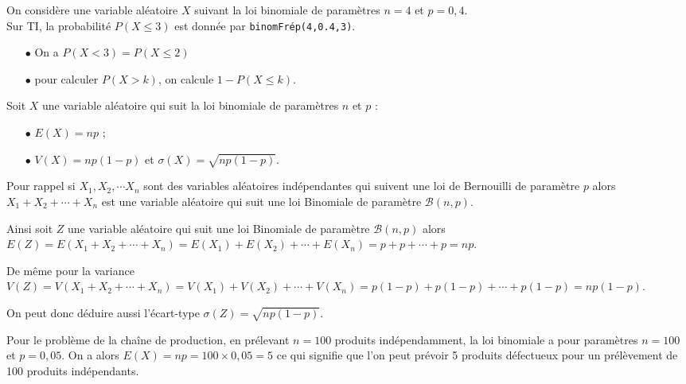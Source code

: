 \documentclass[french]{book}
\newcommand{\calb}{\mathscr{B}}
\begin{document}
\begin{exemple}
On considère une variable aléatoire $X$ suivant la loi binomiale de paramètres $n=4$ et $p=0,4$.\\
Sur TI, la probabilité $P(X\leq 3)$ est donnée par \texttt{binomFrép(4,0.4,3)}.
\end{exemple}

\begin{rem}
\begin{itemize}
\item[$\bullet$] On a $P(X<3)=P(X\leq 2)$\\
\item[$\bullet$] pour calculer $P(X>k)$, on calcule $1-P(X\leq k)$.
\end{itemize}
\end{rem}

\begin{prop}
Soit $X$ une variable aléatoire qui suit la loi binomiale de paramètres $n$ et $p$ :
\begin{itemize}
\item[$\bullet$] $E(X)=np$ ;
\item[$\bullet$] $V(X)=np(1-p)$ et $\sigma(X)=\sqrt{np(1-p)}$.
\end{itemize}
\end{prop}

\begin{demo}
Pour rappel si $X_1,X_2,\cdots X_n$ sont des variables aléatoires indépendantes qui suivent une loi de Bernouilli de paramètre $p$ alors $X_1+X_2+\cdots + X_n$ est une variable aléatoire qui suit une loi Binomiale de paramètre $\calb(n,p)$.

Ainsi soit $Z$ une variable aléatoire qui suit une loi Binomiale de paramètre $\calb(n,p)$ alors $E(Z)=E(X_1+X_2+\cdots + X_n)=E(X_1)+E(X_2)+\cdots +E(X_n)=p+p+\cdots+p=np$.

De même pour la variance $V(Z)=V(X_1+X_2+\cdots + X_n)=V(X_1)+V(X_2)+\cdots +V(X_n)=p(1-p)+p(1-p)+\cdots+p(1-p)=np(1-p)$.

On peut donc déduire aussi l'écart-type $\sigma(Z)=\sqrt{np(1-p)}$.
\end{demo}


\begin{exemple}
Pour le problème de la chaîne de production, en prélevant $n=100$ produits indépendamment, la loi binomiale a pour paramètres $n=100$ et $p=0,05$. On a alors $E(X)=np=100\times 0,05=5$ ce qui signifie que l'on peut prévoir 5 produits défectueux pour un prélèvement de 100 produits indépendants.
\end{exemple}
\end{document}
